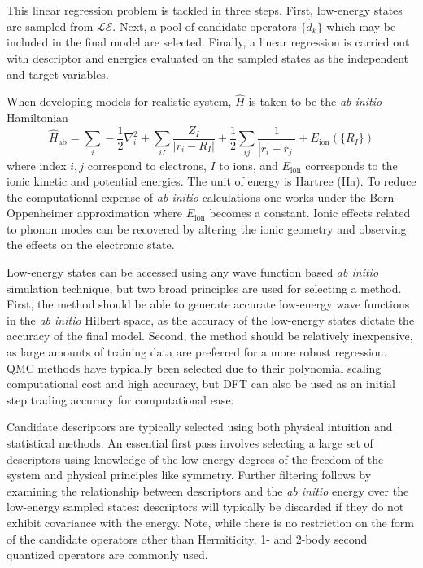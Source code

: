 \documentclass[12pt]{article}
\begin{document}
This linear regression problem is tackled in three steps.
First, low-energy states are sampled from $\mathcal{LE}$.
Next, a pool of candidate operators $\{\hat{d}_k\}$ which may be included in the final model are selected.
Finally, a linear regression is carried out with descriptor and energies evaluated on the sampled states as the independent and target variables.

When developing models for realistic system, $\hat{H}$ is taken to be the \textit{ab initio} Hamiltonian
\begin{equation}
\hat{H}_\text{ab} = \sum_i -\frac{1}{2} \nabla_i^2 + \sum_{iI}\frac{Z_I}{|r_i - R_I|} + \frac{1}{2} \sum_{ij} \frac{1}{|r_i - r_j|} + E_\text{ion}(\{R_I\})  
\label{eq:Hab}
\end{equation} 
where index $i,j$ correspond to electrons, $I$ to ions, and $E_\text{ion}$ corresponds to the ionic kinetic and potential energies. 
The unit of energy is Hartree (Ha).
To reduce the computational expense of \textit{ab initio} calculations one works under the Born-Oppenheimer approximation where $E_\text{ion}$ becomes a constant.
Ionic effects related to phonon modes can be recovered by altering the ionic geometry and observing the effects on the electronic state.

Low-energy states can be accessed using any wave function based \textit{ab initio} simulation technique, but two broad principles are used for selecting a method.
First, the method should be able to generate accurate low-energy wave functions in the \textit{ab initio} Hilbert space, as the accuracy of the low-energy states dictate the accuracy of the final model.
Second, the method should be relatively inexpensive, as large amounts of training data are preferred for a more robust regression.
QMC methods have typically been selected due to their polynomial scaling computational cost and high accuracy, but DFT can also be used as an initial step trading accuracy for computational ease.

Candidate descriptors are typically selected using both physical intuition and statistical methods.
An essential first pass involves selecting a large set of descriptors using knowledge of the low-energy degrees of the freedom of the system and physical principles like symmetry.
Further filtering follows by examining the relationship between descriptors and the \textit{ab initio} energy over the low-energy sampled states: descriptors will typically be discarded if they do not exhibit covariance with the energy.
Note, while there is no restriction on the form of the candidate operators other than Hermiticity, 1- and 2-body second quantized operators are commonly used.
\end{document}
